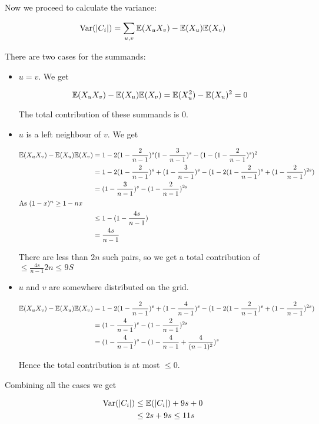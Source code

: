Now we proceed to calculate the variance:

\begin{align*}
\operatorname{Var}(|C_i|) &= \sum_{u,v} \mathbb{E}(X_uX_v) - \mathbb{E}(X_u) \mathbb{E}(X_v)\\
\end{align*}

There are two cases for the summands:

\begin{itemize}
\item $u=v$. We get

\[\mathbb{E}(X_uX_v) -\mathbb{E}(X_u)\mathbb{E}(X_v) = \mathbb{E}(X_u^2) - \mathbb{E}(X_u)^2 = 0\]

The total contribution of these summands is $0$.

\item $u$ is a left neighbour of $v$. We get

\begin{align*}
\mathbb{E}(X_uX_v) - \mathbb{E}(X_u) \mathbb{E}(X_v) &= 1-2(1-\frac{2}{n-1})^s  (1-\frac{3}{n-1})^s -(1-(1-\frac{2}{n-1})^s)^2\\
	&=1-2(1-\frac{2}{n-1})^s+(1-\frac{3}{n-1})^s -(1-2(1-\frac{2}{n-1})^s+(1-\frac{2}{n-1})^{2s})\\
	&=(1-\frac{3}{n-1})^s -(1-\frac{2}{n-1})^{2s}\\
\intertext{As $(1-x)^n\geq 1-nx$}
	&\leq 1 -(1-\frac{4s}{n-1})\\
	&=\frac{4s}{n-1}
\end{align*}
	
There are less than $2n$ such pairs, so we get a total contribution of $\leq \frac{4s}{n-1}2n \leq 9S$

\item $u$ and $v$ are somewhere distributed on the grid. 

\begin{align*}
\mathbb{E}(X_uX_v)-\mathbb{E}(X_u)\mathbb{E}(X_v) &= 1-2(1-\frac{2}{n-1})^s+(1-\frac{4}{n-1})^s-(1-2(1-\frac{2}{n-1})^s +(1-\frac{2}{n-1})^{2s})\\
&= (1-\frac{4}{n-1})^s - (1-\frac{2}{n-1})^{2s}\\
&= (1-\frac{4}{n-1})^s-(1-\frac{4}{n-1}+\frac{4}{(n-1)^2})^s\\
\end{align*}

Hence the total contribution is at most $\leq 0$.
\end{itemize}

Combining all the cases we get 

\begin{align*}
\operatorname{Var}(|C_i|) &\leq \mathbb{E}(|C_i|) +9s + 0 \\
	&\leq 2s+9s\leq 11s
\end{align*}

